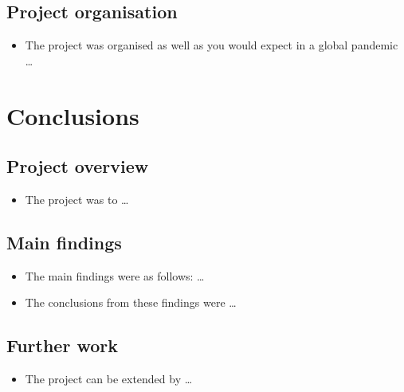 \documentclass[12pt,a4paper]{article}
\begin{document}
\subsection{Project organisation}
\begin{itemize}
    \item The project was organised as well as you would expect in a global pandemic \dots
\end{itemize}

\newpage
\section{Conclusions}
\subsection{Project overview}
\begin{itemize}
    \item The project was to \dots
\end{itemize}

\subsection{Main findings}
\begin{itemize}
    \item The main findings were as follows: \dots
    \item The conclusions from these findings were \dots
\end{itemize}

\subsection{Further work}
\begin{itemize}
    \item The project can be extended by \dots
\end{itemize}

\newpage

\end{document}
